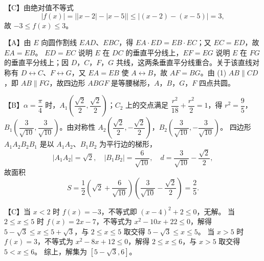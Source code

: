 \begin{answer}
【C】由绝对值不等式
\nopagebreak[4]
\[|f(x)|=\bigl||x-2|-|x-5|\bigr|\leqslant|(x-2)-(x-5)|=3,\]
故 $-3\leqslant f(x)\leqslant3$。

【A】由 $E$ 向圆作割线 $EAD$、$EBC$，得 $EA\cdot ED=EB\cdot EC$；又 $EC=ED$，故 $EA=EB$。
$ED=EC$ 说明 $E$ 在 $DC$ 的垂直平分线上，$EF=EG$ 说明 $E$ 在 $FG$ 的垂直平分线上；因 $D$，$C$，$F$，$G$ 共线，这两条垂直平分线重合。关于该直线对称有 $D\leftrightarrow C$、$F\leftrightarrow G$，又 $EA=EB$ 使 $A\leftrightarrow B$，故 $AF=BG$。由 (1) $AB\parallel CD$，即 $AB\parallel FG$，故四边形 $ABGF$ 是等腰梯形，$A$，$B$，$G$，$F$ 四点共圆。

【B】$\alpha=\dfrac\pi4$ 时，$A_1\left(\dfrac{\sqrt2}2,\dfrac{\sqrt2}2\right)$；$C_2$ 上的交点满足 $\dfrac{r^2}{18}+\dfrac{r^2}2=1$，得 $r^2=\dfrac95$，$B_1\left(\dfrac3{\sqrt{10}},\dfrac3{\sqrt{10}}\right)$。由对称性 $A_2\left(\dfrac{\sqrt2}2,-\dfrac{\sqrt2}2\right)$，$B_2\left(\dfrac3{\sqrt{10}},-\dfrac3{\sqrt{10}}\right)$。
四边形 $A_1A_2B_2B_1$ 是以 $A_1A_2$、$B_1B_2$ 为平行边的梯形，
\nopagebreak[4]
\[|A_1A_2|=\sqrt2,\quad |B_1B_2|=\frac6{\sqrt{10}},\quad d=\frac3{\sqrt{10}}-\frac{\sqrt2}2,\]
故面积
\nopagebreak[4]
\[S=\frac12\left(\sqrt2+\frac6{\sqrt{10}}\right)\left(\frac3{\sqrt{10}}-\frac{\sqrt2}2\right)=\frac25.\]

【C】当 $x<2$ 时 $f(x)=-3$，不等式即 $(x-4)^2+2\leqslant0$，无解。
当 $2\leqslant x\leqslant5$ 时 $f(x)=2x-7$，不等式为 $x^2-10x+22\leqslant0$，解得 $5-\sqrt3\leqslant x\leqslant5+\sqrt3$，与 $2\leqslant x\leqslant5$ 取交得 $5-\sqrt3\leqslant x\leqslant5$。
当 $x>5$ 时 $f(x)=3$，不等式为 $x^2-8x+12\leqslant0$，解得 $2\leqslant x\leqslant6$，与 $x>5$ 取交得 $5<x\leqslant6$。
综上，解集为 $[5-\sqrt3,6]$。



\end{answer}